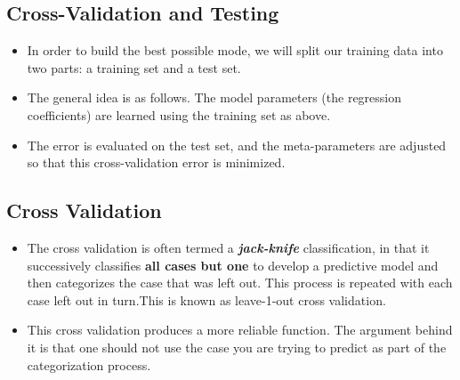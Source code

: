 \documentclass[a4paper,12pt]{article}
\begin{document}
\subsection{Cross-Validation and Testing}
\begin{itemize}
\item In order to build the best possible mode, we will split our training data into two parts: a training set and a test set. 

\item 	The general idea is as follows. The model parameters (the regression coefficients) are learned using the training set as above. 
\item The error is evaluated on the test set, and the meta-parameters are adjusted so that this cross-validation error is minimized. 

\end{itemize}	
\subsection{Cross Validation}
\begin{itemize}	
%	
\item The cross validation is often termed a \textbf{\textit{jack-knife}} classification, in that
it successively classifies \textbf{all cases but one} to develop a predictive model and then
categorizes the case that was left out. This process is repeated with each case left out in
turn.This is known as leave-1-out cross validation. 

\item 	This cross validation produces a more reliable function. The argument behind it is that
one should not use the case you are trying to predict as part of the categorization process.
\end{itemize}



\end{document}

